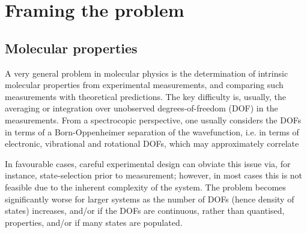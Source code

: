 \section{Framing the problem}

\subsection{Molecular properties}
A very general problem in molecular physics is the determination of intrinsic molecular properties from experimental measurements, and comparing such measurements with theoretical predictions. The key difficulty is, usually, the averaging or integration over unobserved degrees-of-freedom (DOF) in the measurements. From a spectrocopic perspective, one usually considers the DOFs in terms of a Born-Oppenheimer separation of the wavefunction, i.e. in terms of electronic, vibrational and rotational DOFs, which may approximately correlate

In favourable cases, careful experimental design can obviate this issue via, for instance, state-selection prior to measurement; however, in most cases this is not feasible due to the inherent complexity of the system. The problem becomes significantly worse for larger systems as the number of DOFs (hence density of states) increases, and/or if the DOFs are continuous, rather than quantised, properties, and/or if many states are populated.